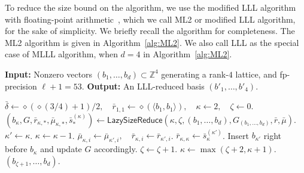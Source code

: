 To reduce the size bound on the algorithm, we use the modified LLL algorithm with floating-point arithmetic~\cite{NS09}, which we call \textsf{ML2} or modified LLL algorithm, for the sake of simplicity.
We briefly recall the algorithm for completeness. The \textsf{ML2} algorithm is given in Algorithm~\ref{alg:ML2}.
We also call \textsf{LLL} as the special case of \textsf{MLLL} algorithm, when $d=4$ in Algorithm~\ref{alg:ML2}.

\begin{algorithm}
\caption{\textsf{ML2}$(b_1,\dots,b_d)$~\cite[Figure~9]{NS09}}
\label{alg:ML2}
\begin{algorithmic}[1]
  \Statex \textbf{Input:} Nonzero vectors
  $(b_1,\dots,b_d)\subset \mathbb{Z}^4$ generating a rank-$4$ lattice, and
  fp-precision $\ell+1=53$.
  \Statex \textbf{Output:} An LLL-reduced basis $(b'_1,\dots,b'_4)$.

  \State $\bar\delta\gets \diamond(\diamond(3/4)+1)/2,\quad
  \bar r_{1,1}\gets \diamond(\langle b_1,b_1\rangle),\quad
  \kappa\gets 2,\quad \zeta\gets 0$.
    \State $(b_\kappa,G,\bar r_{\kappa,*},\bar\mu_{\kappa,*},
    \bar s^{(\kappa)}_*) \gets
    \textsf{LazySizeReduce}(\kappa,\zeta,(b_1,\dots,b_d),G_{(b_1,\dots,b_d)},\bar r,\bar\mu)$. 
    \State $\kappa'\gets \kappa$.
      \State $\kappa\gets \kappa-1$.
    \EndWhile
      \State $\bar\mu_{\kappa,i}\gets \bar\mu_{\kappa',i},\quad
      \bar r_{\kappa,i}\gets \bar r_{\kappa',i}$.
    \EndFor
    \State $\bar r_{\kappa,\kappa}\gets \bar s^{(\kappa')}_\kappa$.
    \State Insert $b_{\kappa'}$ right before $b_\kappa$ and update $G$ accordingly.
      \State $\zeta\gets \zeta+1$.
    \EndIf
    \State $\kappa\gets \max(\zeta+2,\kappa+1)$.
  \EndWhile
  \State \Return $(b_{\zeta+1},\dots,b_d)$.
\end{algorithmic}
\end{algorithm}


